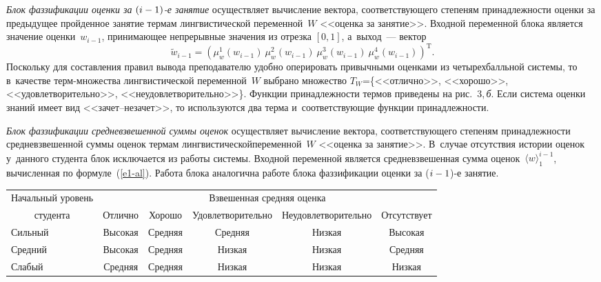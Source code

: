 \begin{multicols}{2}
  \textit{Блок фаззификации оценки за $(i\hm-1)$-е занятие} осуществляет 
вычисление вектора, соответст\-ву\-юще\-го степеням принадлежности оценки за 
предыду\-щее пройденное занятие термам лингвистической переменной~$W$ 
<<оценка за занятие>>. Входной переменной блока является значение 
оценки~$w_{i-1}$, принимающее непрерывные значения из отрезка $[0,1]$, 
а~выход~--- вектор\\[-9pt] 
$$
\tilde{w}_{i-1}= \left( \mu^1_w(w_{i-1})\ 
  \mu^2_w(w_{i-1})\ \mu^3_w (w_{i-1})\ \mu_w^4(w_{i-1})\right)^{\mathrm{T}}.
  $$
Поскольку для со\-став\-ле\-ния правил вывода пре\-подавателю удобно оперировать 
привычными оценка\-ми из четырехбалльной сис\-те\-мы, то в~качестве %
терм-мно\-жест\-ва лингвистической переменной~$W$ выбрано мно\-же\-ст\-во 
$T_W$\;=\;\{<<отлично>>, <<хоро\-шо>>, <<удовле\-тво\-ри\-тель\-но>>, 
<<неудовлетворительно>>\}. Функции принадлежности термов приведены на 
рис.~3,\,\textit{б}. Если система оценки знаний имеет вид <<за\-чет--не\-за\-чет>>, то 
используются два терма и~соответствующие функции принадлеж\-ности.
  
  
  
  
  \textit{Блок фаззификации средневзвешенной суммы оценок} осуществляет 
вычисление вектора, соответствующего степеням принадлежности 
средневзвешенной суммы оценок термам лингвистической\linebreak переменной~$W$ 
<<оценка за занятие>>. В~случае отсутствия истории оценок у~данного 
студента блок исключается из работы системы. Входной переменной является 
средневзвешенная сумма оценок~$\langle w\rangle_1^{i-1}$, вычисленная по 
формуле~(\ref{e1-al}). Работа блока аналогична работе блока фаззификации 
оценки за ($i\hm-1$)-е занятие. 

\begin{table*}[b]\small %
  \begin{center}
  \vspace*{2ex}
  
  \begin{tabular}{|l|c|c|c|c|c|}
  \hline
\multicolumn{1}{|c|}{Начальный уровень}&\multicolumn{5}{c|}{Взвешенная 
средняя оценка}\\
\cline{2-6}
\multicolumn{1}{|c|}{студента}&Отлично&Хорошо&Удовлетворительно&Неудовлетворительно&Отсутствует\\
\hline
Сильный&Высокая&Средняя&Средняя&Низкая&Высокая\\
Средний&Высокая&Средняя&Низкая&Низкая&Средняя\\
Слабый&Средняя&Средняя&Низкая&Низкая&Низкая\\
\hline
\end{tabular}
\end{center}
\end{table*}
  

\end{multicols}
